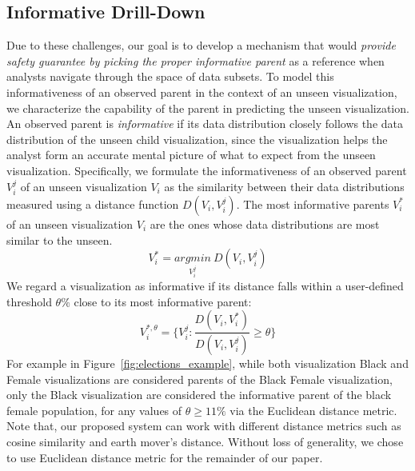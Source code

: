 \subsection{Informative Drill-Down}

Due to these challenges, our goal is to develop a mechanism that would  \emph{provide safety guarantee by picking the proper informative parent} as a reference when analysts navigate through the space of data subsets. To model this informativeness of an observed parent in the context of an unseen visualization, we characterize the capability of the parent in predicting the unseen visualization. An observed parent is \emph{informative} if its data distribution closely follows the data distribution of the unseen child visualization, since the visualization helps the analyst form an accurate mental picture of what to expect from the unseen visualization. Specifically, we formulate the informativeness of an observed parent $V_i^j$ of an unseen visualization $V_i$ as the similarity between their data distributions measured using a distance function $D(V_i, V_i^j)$. The most informative parents $V_i^*$ of an unseen visualization $V_i$ are the ones whose data distributions are most similar to the unseen.
\begin{equation}
    V_i^*=\underset{V_i^j}{argmin}\ D(V_i, V_i^j)
\end{equation}
We regard a visualization as informative if its distance falls within a user-defined threshold $\theta\%$ close to its most informative parent:
\begin{equation}
    V_i^{*, \theta} = \{V_i^j : \frac{D(V_i, V_i^*)}{D(V_i, V_i^j)} \geq \theta\}
\end{equation}
For example in Figure~\ref{fig:elections_example}, while both visualization Black and Female visualizations are considered parents of the Black Female visualization, only the Black visualization are considered the informative parent of the black female population, for any values of $\theta \geq 11\%$ via the Euclidean distance metric. Note that, our proposed system can work with different distance metrics such as cosine similarity and earth mover's distance. Without loss of generality, we chose to use Euclidean distance metric for the remainder of our paper.

\iffalse
